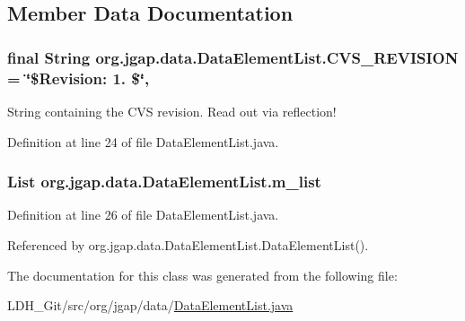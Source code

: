 \subsection{Member Data Documentation}
\hypertarget{classorg_1_1jgap_1_1data_1_1_data_element_list_a396fcd81cfc3dd931a0ee1f6f4496964}{
\subsubsection[{C\-V\-S\-\_\-\-R\-E\-V\-I\-S\-I\-O\-N}]{\setlength{\rightskip}{0pt plus 5cm}final String org.\-jgap.\-data.\-Data\-Element\-List.\-C\-V\-S\-\_\-\-R\-E\-V\-I\-S\-I\-O\-N = \char`\"{}\$Revision\-: 1. \$\char`\"{}\hspace{0.3cm}{\ttfamily [static]}, {\ttfamily [private]}}}\label{classorg_1_1jgap_1_1data_1_1_data_element_list_a396fcd81cfc3dd931a0ee1f6f4496964}
String containing the C\-V\-S revision. Read out via reflection! 

Definition at line 24 of file Data\-Element\-List.\-java.

\hypertarget{classorg_1_1jgap_1_1data_1_1_data_element_list_aab2c6e6fec62fb03c59d7c94d2d61cc2}{
\subsubsection[{m\-\_\-list}]{\setlength{\rightskip}{0pt plus 5cm}List org.\-jgap.\-data.\-Data\-Element\-List.\-m\-\_\-list\hspace{0.3cm}{\ttfamily [private]}}}\label{classorg_1_1jgap_1_1data_1_1_data_element_list_aab2c6e6fec62fb03c59d7c94d2d61cc2}


Definition at line 26 of file Data\-Element\-List.\-java.



Referenced by org.\-jgap.\-data.\-Data\-Element\-List.\-Data\-Element\-List().



The documentation for this class was generated from the following file\-:\begin{DoxyCompactItemize}
\item 
L\-D\-H\-\_\-\-Git/src/org/jgap/data/\hyperlink{_data_element_list_8java}{Data\-Element\-List.\-java}\end{DoxyCompactItemize}
